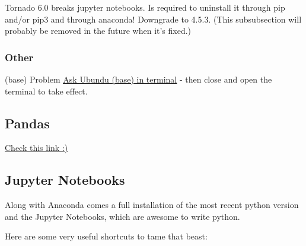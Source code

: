 Tornado 6.0 breaks jupyter notebooks. Is required to uninstall it through pip and/or pip3 and through anaconda! Downgrade to 4.5.3. (This subsubsection will probably be removed in the future when it's fixed.)



\subsubsection{Other}

(base) Problem \href{https://askubuntu.com/questions/1026383/why-does-base-appear-in-front-of-my-terminal-prompt}{\ul{Ask Ubundu (base) in terminal}} - then close and open the terminal to take effect.



\subsection{Pandas}
\href{https://towardsdatascience.com/pandas-tips-and-tricks-33bcc8a40bb9?gi=29663f5b3e5
}{\ul{Check this link :)}}




\subsection{Jupyter Notebooks}
\par Along with Anaconda comes a full installation of the most recent python version and the Jupyter Notebooks, which are awesome to write python.
\par Here are some very useful shortcuts to tame that beast:
\vspace{.5cm}

